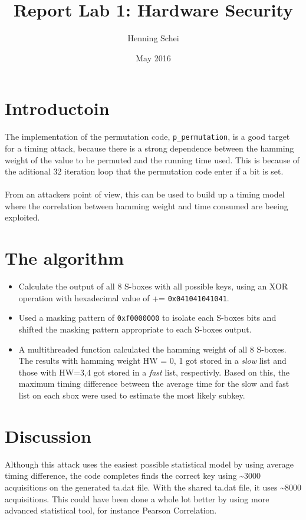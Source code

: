 \documentclass{article}
\title{Report Lab 1: Hardware Security}
\author{Henning Schei}
\date{May 2016}
\begin{document}
\maketitle

\section{Introductoin}
The implementation of the permutation code, \texttt{p\_permutation}, is a good target for a timing attack, because there is a strong dependence between the hamming weight of the value to be permuted and the running time used. This is because of the aditional 32 iteration loop that the permutation code enter if a bit is set. \\ \\ From an attackers point of view, this can be used to build up a timing model where the correlation between hamming weight and time consumed are beeing exploited.       

\section{The algorithm}
 
\begin{itemize}
\item Calculate the output of all 8 S-boxes with all possible keys, using an XOR operation with hexadecimal value of += \texttt{0x041041041041}.  
\item  Used a masking pattern of \texttt{0xf0000000} to isolate each S-boxes bits and shifted the masking pattern appropriate to each S-boxes output. 
\item A multithreaded function calculated the hamming weight of all 8 S-boxes. The results with hamming weight HW = 0, 1  got stored in a \emph{slow} list and those with HW=3,4 got stored in a \emph{fast} list, respectivly.  Based on this, the maximum timing difference between the average time for the slow and fast list on each sbox were used to estimate the most likely subkey. 


\end{itemize}


\section{Discussion}
Although this attack uses the easiest possible statistical model by using average timing difference, the code completes finds the correct key using \textasciitilde 3000 acquisitions on the generated ta.dat file. With the shared ta.dat file, it uses \textasciitilde 8000 acquisitions. This could have been done a whole lot better by using more advanced statistical tool, for instance Pearson Correlation. 
\end{document}
